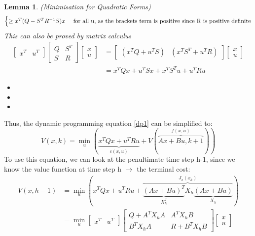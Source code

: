 \documentclass{article}
\newtheorem{lemma}[theorem]{Lemma}
\begin{document}
\begin{lemma}{(Minimisation for Quadratic Forms)}
\[\begin{aligned}
\begin{cases}
\geq x^T(Q - S^T R^{-1}S) x & \text{ \normalfont for all u, as the brackets term is positive since R is positive definite}
\end{cases}
\end{aligned}
\]
This can also be proved by matrix calculus
\[
\begin{aligned}
\begin{bmatrix}
x^T & u^T
\end{bmatrix}
\begin{bmatrix}
Q & S^T \\ S & R
\end{bmatrix}
\begin{bmatrix}
x \\ u
\end{bmatrix}
&= \begin{bmatrix}
(x^T Q + u^T S) & (x^T S^T + u^T R) 
\end{bmatrix}
\begin{bmatrix}
    x \\ u
\end{bmatrix}
\\ 
&= x^T Q x + u^T S x + x^T S^T u + u^T R u
\end{aligned}
\]
\begin{itemize}
    \item{}
    \item{}
    \item{}
\end{itemize}
\end{lemma}
Thus, the dynamic programming equation \eqref{dp1} can be simplified to:
\[
V(x,k) = \min_u \left( \underbrace{x^T Qx + u^T R u}_{c(x,u)} + V (\overbrace{Ax + Bu, k+1}^{f(x,u)})  \right)
\]
To use this equation, we can look at the penultimate time step h-1, since we know the value function at time step h $\rightarrow$ the terminal cost:
\[
\begin{aligned}
V(x,h-1) &= \min_u \left( x^T Q x + u^T R u + \overbrace{\underbrace{(Ax + Bu)^T}_{X_h^T} X_h \underbrace{(Ax + Bu)}_{X_h}}^{J_x(x_h)} \right) \\ 
&= \min_u \begin{bmatrix}
    x^T & u^T
\end{bmatrix}
\begin{bmatrix}
    Q + A^T X_h A & A^T X_h B \\ B^T X_h A & R + B^TX_h B 
\end{bmatrix}
\begin{bmatrix}
    x \\ u
\end{bmatrix}
\end{aligned}
\]
\end{document}
